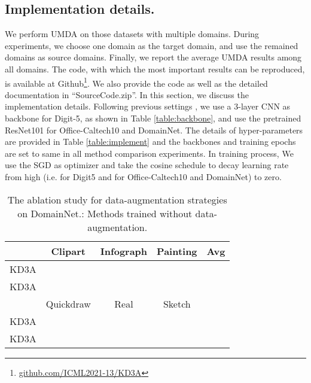 \documentclass{article}
\begin{document}
\subsection{Implementation details.} 
We perform UMDA on those datasets with multiple domains. During experiments, we choose one domain as the target domain, and use the remained domains as source domains. Finally, we report the average UMDA results among all domains. The code, with which the most important results can be reproduced, is available at Github\footnote{\underline{github.com/ICML2021-13/KD3A}}. We also provide the code as well as the detailed documentation
in “SourceCode.zip”. In this section, we discuss the implementation details. Following previous settings \citep{DBLP:conf/iccv/PengBXHSW19}, we use a 3-layer CNN as backbone for Digit-5, as shown in Table \ref{table:backbone}, and use the pretrained ResNet101 for Office-Caltech10 and DomainNet. The details of hyper-parameters are provided in Table \ref{table:implement} and the backbones and training epochs are set to same in all method comparison experiments. In training process, We use the SGD as optimizer and take the cosine schedule to decay learning rate from high (i.e.  for Digit5 and  for Office-Caltech10 and DomainNet) to zero. 
\begin{table}[t]
\begin{tabular}{c|ccc|c}
     & Clipart                    & Infograph                  & Painting                   & Avg             \\ \hline
KD3A &           &           &           &           \\ \hline
KD3A &  &  &  &  \\ \hline
     & Quickdraw                  & Real                       & Sketch                     &                 \\ \hline
KD3A &           &           &           &           \\ \hline
KD3A &  &  &  &  \\ \hline
\end{tabular}
\caption{The ablation study for data-augmentation strategies on DomainNet.\dag: Methods trained without data-augmentation.}
\label{table:data-aug}
\end{table}
\end{document}
